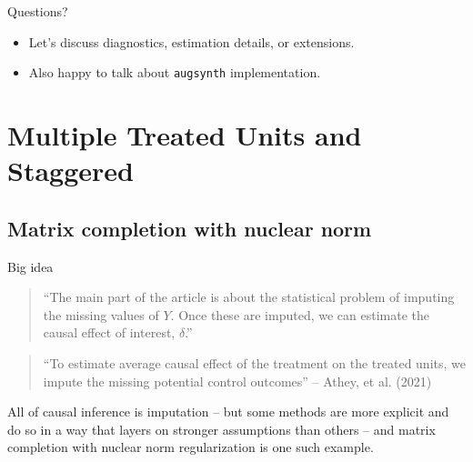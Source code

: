 \documentclass{beamer}
\begin{document}
\begin{frame}{Questions?}
  \begin{itemize}
    \item Let’s discuss diagnostics, estimation details, or extensions.
    \item Also happy to talk about \texttt{augsynth} implementation.
  \end{itemize}
\end{frame}



\section{Multiple Treated Units and Staggered}





\subsection{Matrix completion with nuclear norm}

\begin{frame}{Big idea}

\begin{quote}
``The main part of the article is about the statistical problem of imputing the missing values of $Y$.  Once these are imputed, we can estimate the causal effect of interest, $\delta$.''
\end{quote}

\bigskip

\begin{quote}
``To estimate average causal effect of the treatment on the treated units, we impute the missing potential control outcomes'' -- Athey, et al. (2021)
\end{quote}

\bigskip

All of causal inference is imputation -- but some methods are more explicit and do so in a way that layers on stronger assumptions than others -- and matrix completion with nuclear norm regularization is one such example. 


\end{frame}
\end{document}
